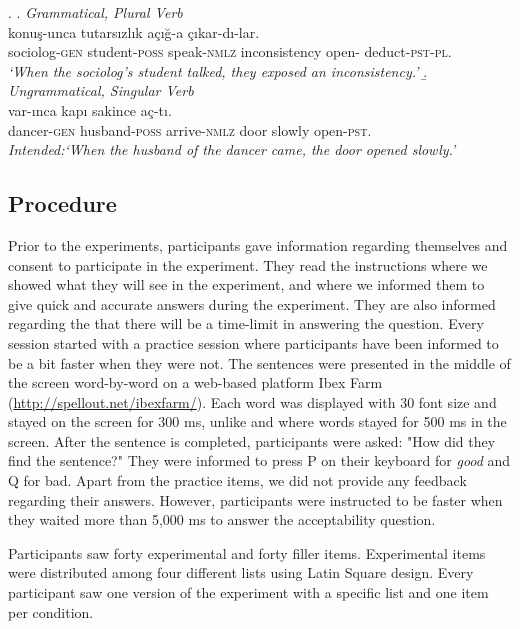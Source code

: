 \documentclass[doc,a4paper,man,natbib,floatsintext,noextraspace]{apa6}\usepackage[]{graphicx}\usepackage[]{color}
\begin{document}
\ex. \label{item:exp1FillerItems}
%
\a. \textit{Grammatical, Plural Verb}\\ 
 konuş-unca tutarsızlık açığ-a çıkar-dı-lar.\\ 
sociolog-\textsc{gen}  student-\textsc{poss} speak-\textsc{nmlz} inconsistency  open-\Dat{} deduct-\textsc{pst}-\textsc{pl}.\\
\glt \textit{`When the sociolog's student talked, they exposed an inconsistency.'}
%
\b. \textit{Ungrammatical, Singular Verb}\\ 
 var-ınca kapı sakince aç-tı.\\ 
dancer-\textsc{gen}  husband-\textsc{poss} arrive-\textsc{nmlz} door slowly  open-\textsc{pst}.\\
\glt \textit{Intended:`When the husband of the dancer came, the door opened slowly.'}

\subsection{Procedure} \label{sec:exp1:procedure}

Prior to the experiments, participants gave information regarding themselves and consent to participate in the experiment. They read the instructions where we showed what they will see in the experiment, and where we informed them to give quick and accurate answers during the experiment. They are also informed regarding the that there will be a time-limit in answering the question. Every session started with a practice session where participants have been informed to be a bit faster when they were not. The sentences were presented in the middle of the screen word-by-word on a web-based platform Ibex Farm (\url{http://spellout.net/ibexfarm/}). Each word was displayed with 30 font size and stayed on the screen for 300 ms, unlike \citet{LagoEtAl:2018} and \citet{WagersEtAl:2009} where words stayed for 500 ms in the screen. After the sentence is completed, participants were asked: "How did they find the sentence?" They were informed to press P on their keyboard for \textit{good} and Q for bad. Apart from the practice items, we did not provide any feedback regarding their answers. However, participants were instructed to be faster when they waited more than 5,000 ms to answer the acceptability question. 

Participants saw forty experimental and forty filler items. Experimental items were distributed among four different lists using Latin Square design. Every participant saw one version of the experiment with a specific list and one item per condition.   
\end{document}
